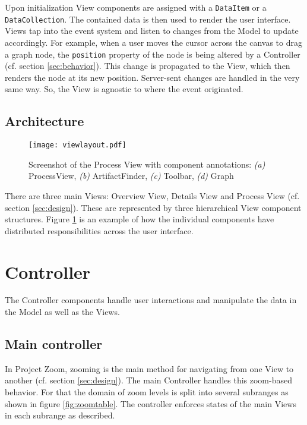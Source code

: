 Upon initialization View components are assigned with a \texttt{DataItem} or a \texttt{DataCollection}. The contained data is then used to render the user interface. Views tap into the event system and listen to changes from the Model to update accordingly. For example, when a user moves the cursor across the canvas to drag a graph node, the \texttt{position} property of the node is being altered by a Controller (cf. section \ref{sec:behavior}). This change is propagated to the View, which then renders the node at its new position. Server-sent changes are handled in the very same way. So, the View is agnostic to where the event originated.

\subsection{Architecture}

\begin{figure}
\texttt{[image: viewlayout.pdf]}
\caption[Screenshot of the Process View with component annotations]{Screenshot of the Process View with component annotations: \textit{(a)} ProcessView, \textit{(b)} ArtifactFinder, \textit{(c)} Toolbar, \textit{(d)} Graph}
\label{fig:viewlayout}
\end{figure}

There are three main Views: Overview View, Details View and Process View (cf. section \ref{sec:design}). These are represented by three hierarchical View component structures. Figure \ref{fig:viewlayout} is an example of how the individual components have distributed responsibilities across the user interface.

\section{Controller}

The Controller components handle user interactions and manipulate the data in the Model as well as the Views.

\subsection{Main controller}
In Project Zoom, zooming is the main method for navigating from one View to another (cf. section \ref{sec:design}). The main Controller handles this zoom-based behavior. For that the domain of zoom levels is split into several subranges as shown in figure \ref{fig:zoomtable}. The controller enforces states of the main Views in each subrange as described.

